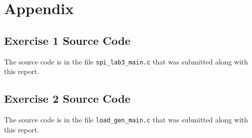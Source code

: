 \documentclass[11pt, letterpaper, titlepage]{article}
\begin{document}
\section{Appendix}

\subsection{Exercise 1 Source Code}
The source code is in the file \texttt{spi_lab3_main.c} that was submitted along with this report.

\subsection{Exercise 2 Source Code}
The source code is in the file \texttt{load_gen_main.c} that was submitted along with this report.
\end{document}

